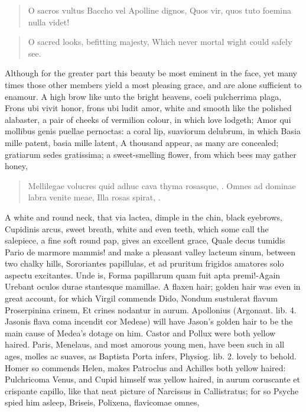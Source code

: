 \begin{latin}
\begin{verse}%
O sacros vultus Baccho vel Apolline dignos,
Quos vir, quos tuto foemina nulla videt!
\end{verse}%
\end{latin}
\translationrule%
\begin{verse}%
O sacred looks, befitting majesty,
Which never mortal wight could safely see.
\end{verse}%

Although for the greater part this beauty be most eminent in the face,
yet many times those other members yield a most pleasing grace, and are
alone sufficient to enamour. A high brow like unto the bright heavens,
coeli pulcherrima plaga, Frons ubi vivit honor, frons ubi ludit amor,
white and smooth like the polished alabaster, a pair of cheeks of
vermilion colour, in which love lodgeth; Amor qui mollibus genis
puellae pernoctas: a coral lip, suaviorum delubrum, in which Basia
mille patent, basia mille latent, A thousand appear, as many are
concealed; gratiarum sedes gratissima; a sweet-smelling flower, from
which bees may gather honey,

\begin{latin}
\begin{verse}%
Mellilegae volucres quid adhuc cava
thyma rosasque, \etc{}.
Omnes ad dominae labra venite meae,
Illa rosas spirat, \etc{}.
\end{verse}%
\end{latin}

A white and round neck, that via lactea, dimple in the chin, black
eyebrows, Cupidinis arcus, sweet breath, white and even teeth, which
some call the salepiece, a fine soft round pap, gives an excellent
grace, Quale decus tumidis Pario de marmore mammis! and
make a pleasant valley lacteum sinum, between two chalky hills,
Sororiantes papillulas, et ad pruritum frigidos amatores solo aspectu
excitantes. Unde is, Forma papillarum quam fuit apta premi!-Again
Urebant oculos durae stantesque mamillae. A flaxen hair; golden hair
was even in great account, for which Virgil commends Dido, Nondum
sustulerat flavum Proserpinina crinem, Et crines nodantur in aurum.
Apollonius (Argonaut. lib. 4. Jasonis flava coma incendit cor Medeae)
will have Jason's golden hair to be the main cause of Medea's dotage on
him. Castor and Pollux were both yellow haired. Paris, Menelaus, and
most amorous young men, have been such in all ages, molles ac suaves,
as Baptista Porta infers,  Physiog. lib. 2. lovely to behold.
Homer so commends Helen, makes Patroclus and Achilles both yellow
haired: Pulchricoma Venus, and Cupid himself was yellow haired, in
aurum coruscante et crispante capillo, like that neat picture of
Narcissus in Callistratus; for so Psyche spied him asleep,
Briseis, Polixena, \etc{} flavicomae omnes,

